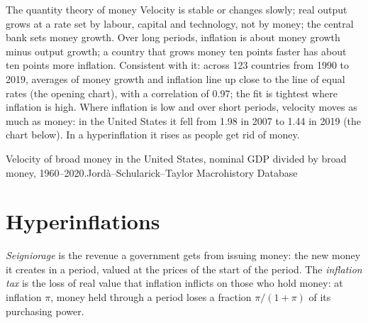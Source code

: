 \begin{model}{The quantity theory of money}
\assumes Velocity is stable or changes slowly; real output grows at a rate set by labour, capital and technology, not by money; the central bank sets money growth.
\predicts Over long periods, inflation is about money growth minus output growth; a country that grows money ten points faster has about ten points more inflation.
\tested Consistent with it: across 123 countries from 1990 to 2019, averages of money growth and inflation line up close to the line of equal rates (the opening chart), with a correlation of
  0.97; the fit is tightest where inflation is high.
\breaks Where inflation is low and over short periods, velocity moves as much as money: in the United States it fell from 1.98 in 2007 to 1.44 in 2019 (the chart below).
  In a hyperinflation it rises as people get rid of money.
\end{model}

\begin{omchart}{Velocity of broad money in the United States, nominal GDP divided by broad money, 1960--2020.}{Jordà--Schularick--Taylor Macrohistory Database}
\end{omchart}

\section{Hyperinflations}\label{sec:g12:inflation-and-money:hyper}

\begin{definition}\label{def:g12:inflation-and-money:seigniorage}
\emph{Seigniorage} is the revenue a government gets from issuing money: the new money it creates in a period, valued at the prices of the start of the
period. The \emph{inflation tax}\label{def:g12:inflation-and-money:inflation-tax} is the loss of real value that inflation inflicts
on those who hold money: at inflation $\pi$, money held through a period loses a fraction $\pi/(1 + \pi)$ of its purchasing power.
\end{definition}


